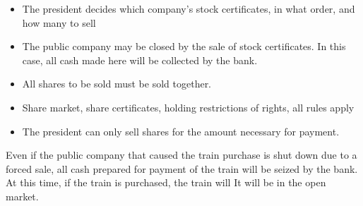 \documentclass{article}
\begin{document}
\begin{CJK}{UTF8}{min}
\begin{itemize}
\item The president decides which company's stock certificates, in
  what order, and how many to sell

\item The public company may be closed by the sale of stock
  certificates. In this case, all cash made here will be collected by
  the bank.

\item All shares to be sold must be sold together.

\item Share market, share certificates, holding restrictions of
  rights, all rules apply

\item The president can only sell shares for the amount necessary for
  payment.
\end{itemize}

Even if the public company that caused the train purchase is shut down
due to a forced sale, all cash prepared for payment of the train will
be seized by the bank. At this time, if the train is purchased, the
train will It will be in the open market.












\end{CJK}
\end{document}
